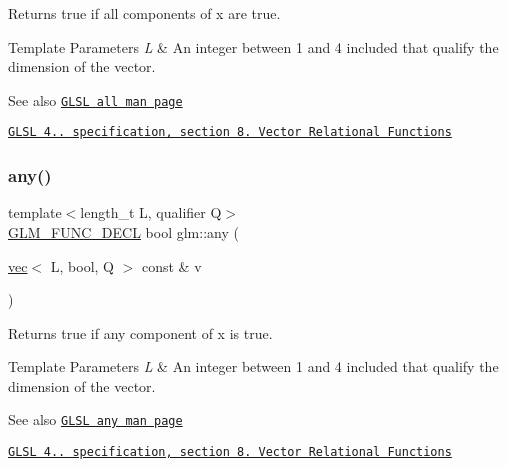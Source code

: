 Returns true if all components of x are true.


\begin{DoxyTemplParams}{Template Parameters}
{\em L} & An integer between 1 and 4 included that qualify the dimension of the vector.\\
\hline
\end{DoxyTemplParams}
\begin{DoxySeeAlso}{See also}
\href{http://www.opengl.org/sdk/docs/manglsl/xhtml/all.xml}{\tt G\+L\+SL all man page} 

\href{http://www.opengl.org/registry/doc/GLSLangSpec.4.20.8.pdf}{\tt G\+L\+SL 4.. specification, section 8. Vector Relational Functions} 
\end{DoxySeeAlso}
\mbox{\label{group__core__func__vector__relational_gadcc289349a96ef7642b14bc151ee4ae8}} 
\subsubsection{\texorpdfstring{any()}{any()}}
{\footnotesize\ttfamily template$<$length\+\_\+t L, qualifier Q$>$ \\
\mbox{\hyperlink{setup_8hpp_ab2d052de21a70539923e9bcbf6e83a51}{G\+L\+M\+\_\+\+F\+U\+N\+C\+\_\+\+D\+E\+CL}} bool glm\+::any (\begin{DoxyParamCaption}\item[{\mbox{\hyperlink{structglm_1_1vec}{vec}}$<$ L, bool, Q $>$ const \&}]{v }\end{DoxyParamCaption})}

Returns true if any component of x is true.


\begin{DoxyTemplParams}{Template Parameters}
{\em L} & An integer between 1 and 4 included that qualify the dimension of the vector.\\
\hline
\end{DoxyTemplParams}
\begin{DoxySeeAlso}{See also}
\href{http://www.opengl.org/sdk/docs/manglsl/xhtml/any.xml}{\tt G\+L\+SL any man page} 

\href{http://www.opengl.org/registry/doc/GLSLangSpec.4.20.8.pdf}{\tt G\+L\+SL 4.. specification, section 8. Vector Relational Functions} 
\end{DoxySeeAlso}
\mbox{\label{group__core__func__vector__relational_ga774f9e3a93c913f1e7c215a549707d59}} 
